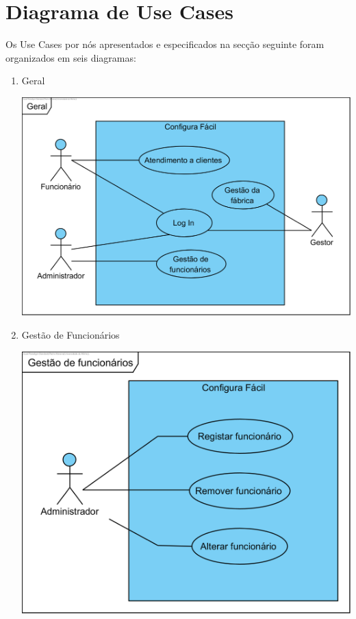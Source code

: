 \documentclass[11pt]{article} %
\begin{document}
\section{Diagrama de Use Cases}
\label{useCases}
Os Use Cases por nós apresentados e especificados na secção seguinte foram organizados em seis diagramas:
\begin{enumerate}
	\item Geral
		\begin{center}
 			\includegraphics[]{Geral.png}
		\end{center}
	\item Gestão de Funcionários
		\begin{center}
 			\includegraphics[]{Gestao_de_funcionarios.png}
		\end{center}\newpage

\end{enumerate}
\end{document}
